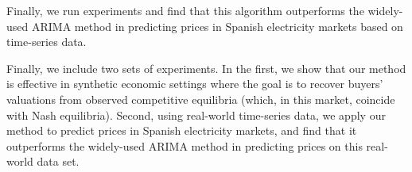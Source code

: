 Finally, we run experiments and find that this algorithm outperforms the widely-used ARIMA method in predicting prices in Spanish electricity markets based on time-series data.
\fi


Finally, we include two sets of experiments.
In the first, we show that our method is effective in synthetic economic settings where the goal is to recover buyers' valuations from observed competitive equilibria (which, in this market, coincide with Nash equilibria).
Second, using real-world time-series data, we apply our method to predict prices in Spanish electricity markets, 
and find that it outperforms the widely-used ARIMA method in predicting prices on this real-world data set.


